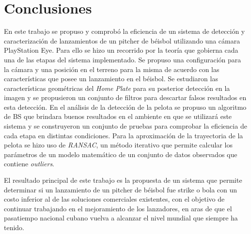 \chapter*{Conclusiones}\label{chapter:conclusions}

En este trabajo se propuso y comprobó la eficiencia de un sistema de detección y caracterización de lanzamientos de un pitcher de béisbol utilizando una cámara PlayStation Eye. Para ello se hizo un recorrido por la teoría que gobierna cada una de las etapas del sistema implementado. Se propuso una configuración para la cámara y una posición en el terreno para la misma de acuerdo con las características que posee un lanzamiento en el béisbol. Se estudiaron las características geométricas del \textit{Home Plate} para su posterior detección en la imagen y se propusieron un conjunto de filtros para descartar falsos resultados en esta detección. En el análisis de la detección de la pelota se propuso un algoritmo de BS que brindara buenos resultados en el ambiente en que se utilizará este sistema y se construyeron un conjunto de pruebas para comprobar la eficiencia de cada etapa en distintas condiciones. Para la aproximación de la trayectoria de la pelota se hizo uso de \textit{RANSAC}, un método iterativo que permite calcular los parámetros de un modelo matemático de un conjunto de datos observados que contiene \textit{outliers}.


El resultado principal de este trabajo es la propuesta de un sistema que permite determinar si un lanzamiento de un pitcher de béisbol fue strike o bola con un costo inferior al de las soluciones comerciales existentes, con el objetivo de continuar trabajando en el mejoramiento de los lanzadores, en aras de que el pasatiempo nacional cubano vuelva a alcanzar el nivel mundial que siempre ha tenido.

